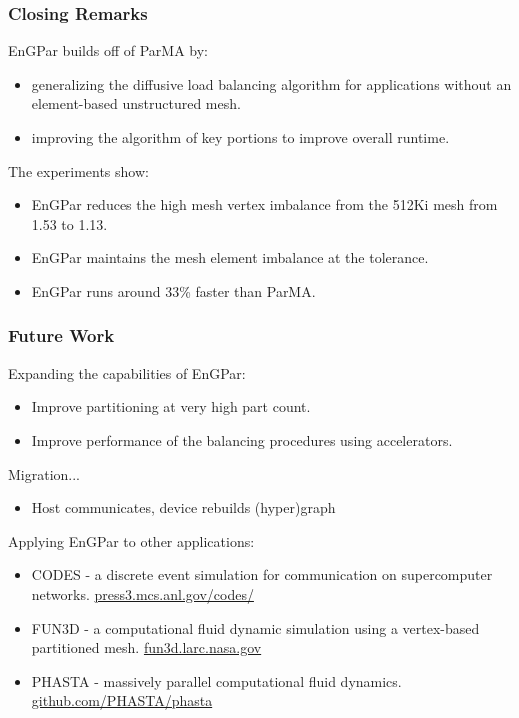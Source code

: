\documentclass{beamer}
\begin{document}
\begin{frame}
  \frametitle{Closing Remarks}
  EnGPar builds off of ParMA by:
  \begin {itemize}
  \item generalizing the diffusive load balancing algorithm for applications without an element-based unstructured mesh.
  \item improving the algorithm of key portions to improve overall runtime.
  \end{itemize}
  The experiments show:
  \begin {itemize}
  \item EnGPar reduces the high mesh vertex imbalance from the 512Ki mesh from 1.53 to 1.13.
  \item EnGPar maintains the mesh element imbalance at the tolerance.
  \item EnGPar runs around 33\% faster than ParMA.
  \end{itemize}
\end{frame}

\begin{frame}
  \frametitle{Future Work}
  Expanding the capabilities of EnGPar:
  \begin{itemize}
    \item Improve partitioning at very high part count.
    \item Improve performance of the balancing procedures using accelerators.
  \end{itemize}
  Migration...
  \begin{itemize}
    \item Host communicates, device rebuilds (hyper)graph
  \end{itemize}
  Applying EnGPar to other applications:
  \begin{itemize}
    \item CODES - a discrete event simulation for communication on supercomputer networks. \url{press3.mcs.anl.gov/codes/}
    \item FUN3D - a computational fluid dynamic simulation using a vertex-based partitioned mesh. \url{fun3d.larc.nasa.gov}
    \item PHASTA - massively parallel computational fluid dynamics. \url{github.com/PHASTA/phasta}
  \end{itemize}
\end{frame}
\end{document}
